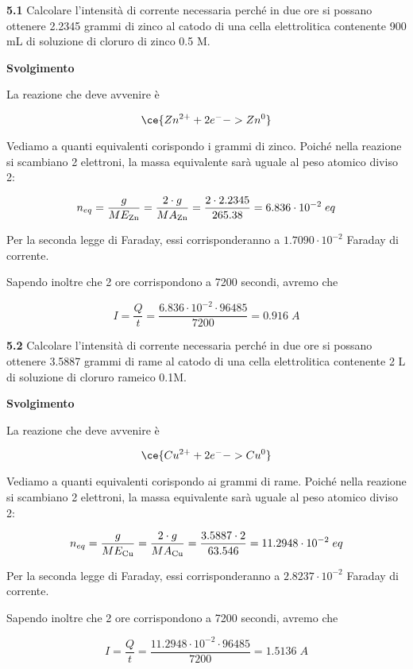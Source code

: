 \textbf{5.1} Calcolare l'intensità di corrente necessaria perché in due ore si possano ottenere 2.2345 grammi di zinco al catodo di una cella elettrolitica contenente 900 mL di soluzione di cloruro di zinco 0.5 M.

\vspace{0.2cm}\large\textbf{Svolgimento}\normalsize

\vspace{0.2cm}La reazione che deve avvenire è

$$\ce{Zn^{2+} + 2e^- -> Zn^{0}}$$

Vediamo a quanti equivalenti corispondo i grammi di zinco. Poiché nella reazione si scambiano 2 elettroni, la massa equivalente sarà uguale al peso atomico diviso 2:

$$n_{eq}=\frac{g}{ME_{\rm Zn}}=\frac{2 \cdot g}{MA_{\rm Zn}}
=\frac{2 \cdot 2.2345}{265.38}
=6.836 \cdot 10^{-2}\;eq$$

Per la seconda legge di Faraday, essi corrisponderanno a $1.7090 \cdot 10^{-2}$ Faraday di corrente.

Sapendo inoltre che 2 ore corrispondono a 7200 secondi, avremo che

$$I=\frac{Q}{t}
=\frac{6.836 \cdot 10^{-2} \cdot 96485}{7200}=0.916\;A$$

\vspace{0.2cm}\textbf{5.2} Calcolare l'intensità di corrente necessaria perché in due ore si possano ottenere 3.5887 grammi di rame al catodo di una cella elettrolitica contenente 2 L di soluzione di cloruro rameico 0.1M.

\vspace{0.2cm}\large\textbf{Svolgimento}\normalsize

\vspace{0.2cm}La reazione che deve avvenire è

$$\ce{Cu^{2+} + 2e^- -> Cu^{0}}$$

Vediamo a quanti equivalenti corispondo ai grammi di rame. Poiché nella reazione si scambiano 2 elettroni, la massa equivalente sarà uguale al peso atomico diviso 2:

$$n_{eq}=\frac{g}{ME_{\rm Cu}}=\frac{2 \cdot g}{MA_{\rm Cu}}
=\frac{3.5887 \cdot 2}{63.546}
=11.2948 \cdot 10^{-2}\;eq$$

Per la seconda legge di Faraday, essi corrisponderanno a $2.8237 \cdot 10^{-2}$ Faraday di corrente.

Sapendo inoltre che 2 ore corrispondono a 7200 secondi, avremo che

$$I=\frac{Q}{t}
=\frac{11.2948 \cdot 10^{-2} \cdot 96485}{7200}=1.5136\;A$$

